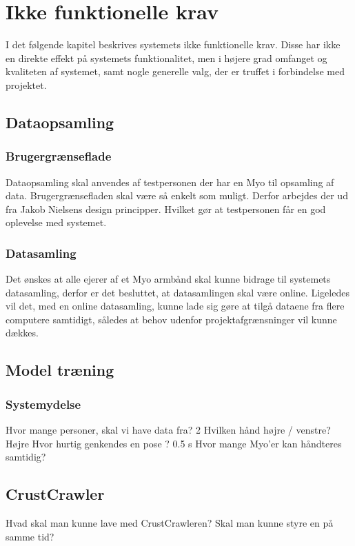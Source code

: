 \thispagestyle{fancy}
\chapter{Ikke funktionelle krav}
I det følgende kapitel beskrives systemets ikke funktionelle krav. Disse har ikke en direkte effekt på systemets funktionalitet, men i højere grad omfanget og kvaliteten af systemet, samt nogle generelle valg, der er truffet i forbindelse med projektet.

\section{Dataopsamling}

\subsection{Brugergrænseflade}
Dataopsamling skal anvendes af testpersonen der har en Myo til opsamling af data. Brugergrænsefladen skal være så enkelt som muligt.  Derfor arbejdes der ud fra Jakob Nielsens design principper. Hvilket gør at testpersonen får en god oplevelse med systemet.

\subsection{Datasamling}
Det ønskes at alle ejerer af et Myo armbånd skal kunne bidrage til systemets datasamling, derfor er det besluttet, at datasamlingen skal være online. Ligeledes vil det, med en online datasamling, kunne lade sig gøre at tilgå dataene fra flere computere samtidigt, således at behov udenfor projektafgrænsninger vil kunne dækkes.

\section{Model træning}

\subsection{Systemydelse}
Hvor mange personer, skal vi have data fra? 2
Hvilken hånd højre / venstre? Højre
Hvor hurtig genkendes en pose ? 0.5 s
Hvor mange Myo'er kan håndteres samtidig?



\section{CrustCrawler}

Hvad skal man kunne lave med CrustCrawleren?
Skal man kunne styre en på samme tid?